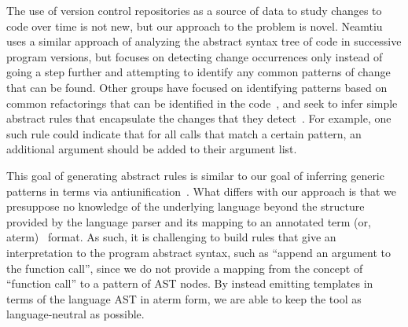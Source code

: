 The use of version control repositories as a source of data to study changes
to code over time is not new, but our approach to the problem is novel.
Neamtiu~\cite{neamtiu05understand} uses a similar approach of analyzing the
abstract syntax tree of code in successive program versions, but focuses on
detecting change occurrences only instead of going a step further and
attempting to identify any common patterns of change that can be found.  
Other groups have focused on identifying patterns based on common
refactorings that can be identified in the code~\cite{weissgerber06identify},
and seek to infer simple abstract rules that encapsulate the changes
that they detect~\cite{kim07automatic}.  For example, one such rule could
indicate that for all calls that match a certain pattern, an additional
argument should be added to their argument list.

This goal of generating abstract rules is similar to our goal of inferring
generic patterns in terms via
antiunification~\cite{reynolds70antiunification,plotkin70antiunification}.
What differs with our approach is that we presuppose no knowledge of the
underlying language beyond the structure provided by the language parser and
its mapping to an annotated term (or, aterm)~\cite{brand00aterm} format.  As
such, it is challenging to build rules that give an interpretation to the
program abstract syntax, such as ``append an argument to the function call'',
since we do not provide a mapping from the concept of ``function call'' to a
pattern of AST nodes.  By instead emitting templates in terms of the language
AST in aterm form, we are able to keep the tool as language-neutral as
possible.
